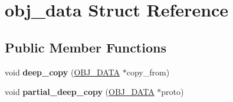 \hypertarget{structobj__data}{\section{obj\-\_\-data Struct Reference}
\label{structobj__data}
}
\subsection*{Public Member Functions}
\begin{DoxyCompactItemize}
\item 
\hypertarget{structobj__data_ace2bc3c426d4f6f644df0cce320f2bd5}{void {\bfseries deep\-\_\-copy} (\hyperlink{structobj__data}{O\-B\-J\-\_\-\-D\-A\-T\-A} $\ast$copy\-\_\-from)}\label{structobj__data_ace2bc3c426d4f6f644df0cce320f2bd5}

\item 
\hypertarget{structobj__data_aeb2b10e708f597567a9807d2e9ecee0c}{void {\bfseries partial\-\_\-deep\-\_\-copy} (\hyperlink{structobj__data}{O\-B\-J\-\_\-\-D\-A\-T\-A} $\ast$proto)}\label{structobj__data_aeb2b10e708f597567a9807d2e9ecee0c}

\end{DoxyCompactItemize}
